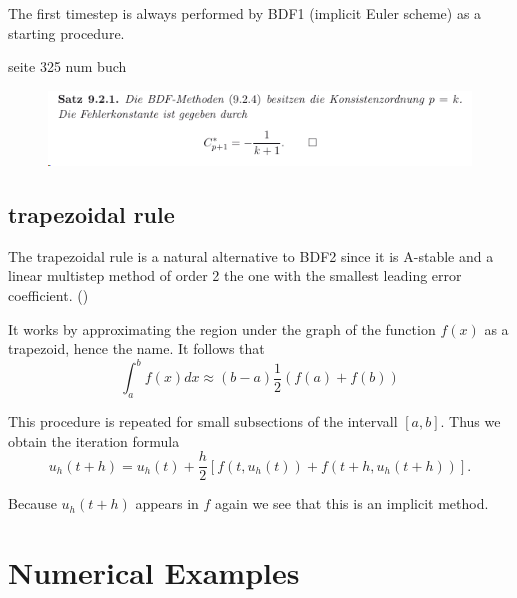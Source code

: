 	The first timestep is always performed by BDF1 (implicit Euler scheme) as a starting procedure.
	
	seite 325 num buch
	\begin{figure}[H]
		\centering
		\includegraphics[width=0.7\linewidth]{screenshot028}
		\caption{}
		\label{fig:screenshot028}
	\end{figure}
	
	
	
\subsection{trapezoidal rule}

	The trapezoidal rule is a natural alternative to BDF2 since it is A-stable and a linear multistep method of order 2 the one with the smallest leading error coefficient. (\cite{ModellingAndDiscretizationOfCircuitProblems})
	
	It works by approximating the region under the graph of the function $f(x)$ as a trapezoid, hence the name. It follows that	
	\begin{displaymath}
		\int_{a}^{b} f(x) dx \approx (b-a)\frac{1}{2} (f(a)+f(b))
	\end{displaymath}
	
	This procedure is repeated for small subsections of the intervall $[a,b]$. Thus we obtain the iteration formula
	\begin{displaymath}
		u_h (t+h) = u_h(t) +\frac{h}{2}[f(t,u_h(t)) + f(t+h, u_h(t+h))].
	\end{displaymath}
%	
	
	Because $u_h(t+h)$ appears in $f$ again we see that this is an implicit method. %
	
\section{Numerical Examples}
	
